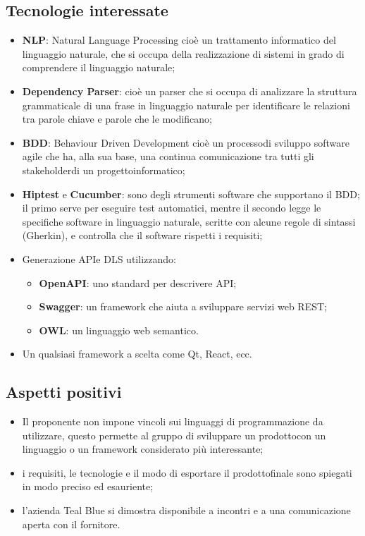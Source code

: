 \subsection{Tecnologie interessate}
\begin{itemize}
	\item \textbf{NLP}: Natural Language Processing cioè un trattamento informatico del linguaggio naturale, che si occupa della realizzazione di sistemi in grado di comprendere il linguaggio naturale;	
	\item \textbf{Dependency Parser}: cioè un parser che si occupa di analizzare la struttura grammaticale di una frase in linguaggio naturale per identificare le relazioni tra parole chiave e parole che le modificano;
	\item \textbf{BDD}: Behaviour Driven Development cioè un processo\glosp di sviluppo software agile che ha, alla sua base, una continua comunicazione tra tutti gli stakeholder\glosp di un progetto\glosp informatico;
	\item \textbf{Hiptest} e \textbf{Cucumber}: sono degli strumenti software che supportano il BDD; il primo serve per eseguire test automatici, mentre il secondo legge le specifiche software in linguaggio naturale, scritte con alcune regole di sintassi (Gherkin), e controlla che il software rispetti i requisiti;
	\item Generazione API\glosp e DLS utilizzando:
	\begin{itemize}
		\item \textbf{OpenAPI}: uno standard per descrivere API\glo;
		\item \textbf{Swagger}: un framework che aiuta a sviluppare servizi web REST\glo;
		\item \textbf{OWL}: un linguaggio web semantico.
	\end{itemize}
	\item Un qualsiasi framework a scelta come Qt, React, ecc.
\end{itemize} 
\subsection{Aspetti positivi}
\begin{itemize} 
	\item Il proponente non impone vincoli sui linguaggi di programmazione da utilizzare, questo permette al gruppo di sviluppare un prodotto\glosp con un linguaggio o un framework considerato più interessante;
	\item i requisiti, le tecnologie e il modo di esportare il prodotto\glosp finale sono spiegati in modo preciso ed esauriente;
	\item l'azienda Teal Blue si dimostra disponibile a incontri e a una comunicazione aperta con il fornitore.
\end{itemize}
